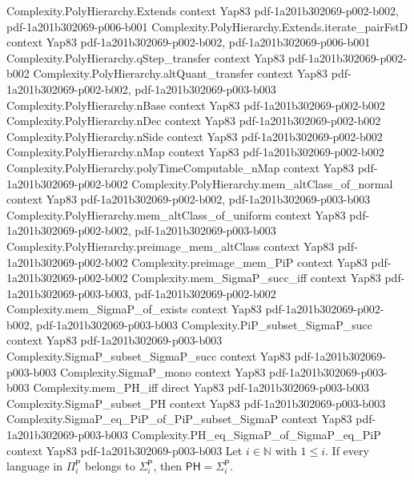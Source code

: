 \begin{theorem}
\proofstep
  {Complexity.PolyHierarchy.Extends}
  {context}
  {Yap83}
  {pdf-1a201b302069-p002-b002,
    pdf-1a201b302069-p006-b001}
\proofstep
  {Complexity.PolyHierarchy.Extends.iterate_pairFstD}
  {context}
  {Yap83}
  {pdf-1a201b302069-p002-b002,
    pdf-1a201b302069-p006-b001}
\proofstep
  {Complexity.PolyHierarchy.qStep_transfer}
  {context}
  {Yap83}
  {pdf-1a201b302069-p002-b002}
\proofstep
  {Complexity.PolyHierarchy.altQuant_transfer}
  {context}
  {Yap83}
  {pdf-1a201b302069-p002-b002,
    pdf-1a201b302069-p003-b003}
\proofstep
  {Complexity.PolyHierarchy.nBase}
  {context}
  {Yap83}
  {pdf-1a201b302069-p002-b002}
\proofstep
  {Complexity.PolyHierarchy.nDec}
  {context}
  {Yap83}
  {pdf-1a201b302069-p002-b002}
\proofstep
  {Complexity.PolyHierarchy.nSide}
  {context}
  {Yap83}
  {pdf-1a201b302069-p002-b002}
\proofstep
  {Complexity.PolyHierarchy.nMap}
  {context}
  {Yap83}
  {pdf-1a201b302069-p002-b002}
\proofstep
  {Complexity.PolyHierarchy.polyTimeComputable_nMap}
  {context}
  {Yap83}
  {pdf-1a201b302069-p002-b002}
\proofstep
  {Complexity.PolyHierarchy.mem_altClass_of_normal}
  {context}
  {Yap83}
  {pdf-1a201b302069-p002-b002,
    pdf-1a201b302069-p003-b003}
\proofstep
  {Complexity.PolyHierarchy.mem_altClass_of_uniform}
  {context}
  {Yap83}
  {pdf-1a201b302069-p002-b002,
    pdf-1a201b302069-p003-b003}
\proofstep
  {Complexity.PolyHierarchy.preimage_mem_altClass}
  {context}
  {Yap83}
  {pdf-1a201b302069-p002-b002}
\proofstep
  {Complexity.preimage_mem_PiP}
  {context}
  {Yap83}
  {pdf-1a201b302069-p002-b002}
\proofstep
  {Complexity.mem_SigmaP_succ_iff}
  {context}
  {Yap83}
  {pdf-1a201b302069-p003-b003,
    pdf-1a201b302069-p002-b002}
\proofstep
  {Complexity.mem_SigmaP_of_exists}
  {context}
  {Yap83}
  {pdf-1a201b302069-p002-b002,
    pdf-1a201b302069-p003-b003}
\proofstep
  {Complexity.PiP_subset_SigmaP_succ}
  {context}
  {Yap83}
  {pdf-1a201b302069-p003-b003}
\proofstep
  {Complexity.SigmaP_subset_SigmaP_succ}
  {context}
  {Yap83}
  {pdf-1a201b302069-p003-b003}
\proofstep
  {Complexity.SigmaP_mono}
  {context}
  {Yap83}
  {pdf-1a201b302069-p003-b003}
\proofstep
  {Complexity.mem_PH_iff}
  {direct}
  {Yap83}
  {pdf-1a201b302069-p003-b003}
\proofstep
  {Complexity.SigmaP_subset_PH}
  {context}
  {Yap83}
  {pdf-1a201b302069-p003-b003}
\proofstep
  {Complexity.SigmaP_eq_PiP_of_PiP_subset_SigmaP}
  {context}
  {Yap83}
  {pdf-1a201b302069-p003-b003}
\proofstep
  {Complexity.PH_eq_SigmaP_of_SigmaP_eq_PiP}
  {context}
  {Yap83}
  {pdf-1a201b302069-p003-b003}
Let $i\in\mathbb{N}$ with $1\le i$. If every language in $\Pi_i^\mathsf{P}$ belongs to
$\Sigma_i^\mathsf{P}$, then $\mathsf{PH}=\Sigma_i^\mathsf{P}$.
\end{theorem}

